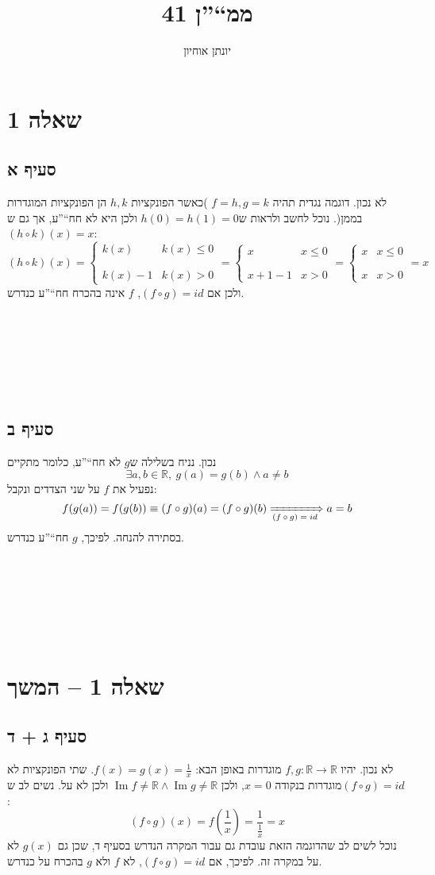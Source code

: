 \documentclass[11pt, oneside]{article}
\title{ממ``''ן 41}
\author{יונתן אוחיון}
\newcommand{\qed}{\R{$\blacksquare$}}
\newcommand{\br}{\\\\\\\\\\\\\\}
\newcommand{\logr}[1]{\xRightarrow[\text{#1}]{}}
\newcommand{\mR}{\mathbb{R}}
\newcommand{\finv}[1]{\frac{1}{#1}}
\DeclareMathOperator{\Ima}{Im}
\begin{document}
\maketitle

\section*{שאלה 1}
\subsection*{סעיף א}
לא נכון. דוגמה נגדית תהיה $f = h, g = k$ )כאשר הפונקציות $h, k$ הן הפונקציות המוגדרות בממן(. נוכל לחשב ולראות ש$h(0) = h(1) = 0$ ולכן היא לא חח``''ע, אך גם ש$(h \circ k)(x) = x$:
\[
(h \circ k)(x)
= \begin{cases}
k(x) & k(x) \le 0\\\\\\
k(x) - 1 & k(x) > 0
\end{cases}
= \begin{cases}
x & x \le 0\\\\\\
x + 1 - 1 & x > 0
\end{cases}
= \begin{cases}
x & x \le 0\\\\\\
x & x > 0
\end{cases} = x
\]
ולכן אם $(f \circ g) = id$, $f$ אינה בהכרח חח``''ע כנדרש.
\br\qed

\subsection*{סעיף ב}
נכון. נניח בשלילה ש$g$ לא חח``''ע, כלומר מתקיים
\[
\exists a, b \in \mR,\ g(a) = g(b) \land a \neq b
\]
נפעיל את $f$ על שני הצדדים ונקבל:
\[
f(g(a)) = f(g(b)) \equiv (f \circ g)(a) = (f \circ g)(b) \logr{$(f \circ g) = id$} a = b
\]
בסתירה להנחה. לפיכך, $g$ חח``''ע כנדרש.
\br\qed
\clearpage

\section*{שאלה 1 -- המשך}
\subsection*{סעיף ג + ד}
לא נכון. יהיו $f, g: \mR \to \mR$ מוגדרות באופן הבא: $f(x) = g(x) = \finv{x}$. שתי הפונקציות לא מוגדרות בנקודה $x = 0$, ולכן $\Ima{f} \neq \mR \land \Ima{g} \neq \mR$ ולכן לא על. נשים לב ש$(f \circ g) = id$:
\[
(f \circ g)(x) = f\left(\finv{x}\right) = \finv{\finv{x}} = x
\]
נוכל לשים לב שהדוגמה הזאת עובדת גם עבור המקרה הנדרש בסעיף ד, שכן גם $g(x)$ לא על במקרה זה. לפיכך, אם $(f \circ g) = id$, לא $f$ ולא $g$ בהכרח על כנדרש.
\br\qed
\end{document}
